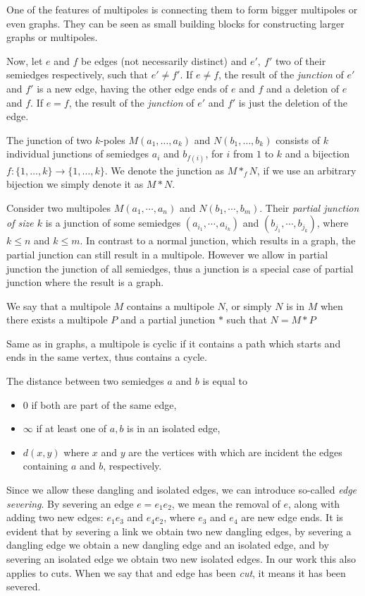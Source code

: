 \documentclass[12pt, twoside]{book}
\begin{document}
One of the features of multipoles is connecting them to form bigger multipoles or even graphs. They can be seen as small building blocks for constructing larger graphs or multipoles. 

Now, let $e$ and $f$ be edges (not necessarily distinct) and $e',~f'$ two of their semiedges respectively, such that $e'\neq f'$. If $e\neq f$, the result of the \textit{junction} of $e'$ and $f'$ is a new edge, having the other edge ends of $e$ and $f$ and a deletion of $e$ and $f$. If $e=f$, the result of the \textit{junction} of $e'$ and $f'$ is just the deletion of the edge.

The junction of two $k$-poles $M(a_1,\dots,a_k)$ and $N(b_1,\dots,b_k)$ consists of $k$ individual junctions of semiedges $a_i$ and $b_{f(i)}$, for $i$ from $1$ to $k$ and a bijection $f:\{1,\dots,k\}\rightarrow\{1,\dots,k\}$. We denote the junction as $M*_fN$, if we use an arbitrary bijection we simply denote it as $M*N$.

Consider two multipoles $M(a_1,\cdots,a_n)$ and $N(b_1,\cdots,b_m)$. Their \textit{partial junction of size $k$} is a junction of some semiedges $(a_{i_1},\cdots, a_{i_k})$ and $(b_{j_1},\cdots, b_{j_k})$, where $k\leq n$ and $k\leq m$. In contrast to a normal junction, which results in a graph, the partial junction can still result in a multipole. However we allow in partial junction the junction of all semiedges, thus a junction is a special case of partial junction where the result is a graph.

We say that a multipole $M$ contains a multipole $N$, or simply $N$ is in $M$ when there exists a multipole $P$ and a partial junction $*$ such that $N=M*P$

Same as in graphs, a multipole is cyclic if it contains a path which starts and ends in the same vertex, thus contains a cycle.

The distance between two semiedges $a$ and $b$ is equal to
\begin{itemize}
	\item 0 if both are part of the same edge,
	\item $\infty$ if at least one of $a,b$ is in an isolated edge,
	\item $d(x,y)$ where $x$ and $y$ are the vertices with which are incident the edges containing $a$ and $b$, respectively.
\end{itemize}

Since we allow these dangling and isolated edges, we can introduce so-called \textit{edge severing}. By severing an edge $e=e_1e_2$, we mean the removal of $e$, along with adding two new edges: $e_1e_3$ and $e_4e_2$, where $e_3$ and $e_4$ are new edge ends. It is evident that by severing a link we obtain two new dangling edges, by severing a dangling edge we obtain a new dangling edge and an isolated edge, and by severing an isolated edge we obtain two new isolated edges. In our work this also applies to cuts. When we say that and edge has been \textit{cut}, it means it has been severed.
\end{document}

